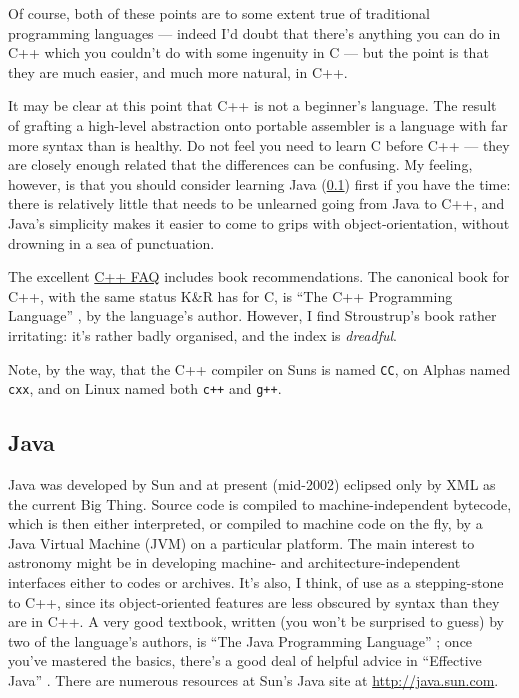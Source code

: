 \documentclass[11pt,oneside,chapters]{starlink}
\begin{document}
Of course, both of these points are to some extent true
of traditional programming languages --- indeed I'd doubt
that there's anything you can do in C++ which you couldn't
do with some ingenuity in C --- but the point is that they
are much easier, and much more natural, in C++.

It may be clear at this point that C++ is not a
beginner's language.  The result of grafting a high-level
abstraction onto portable assembler is a language with far
more syntax than is healthy.  Do not feel you need to
learn C before C++ --- they are closely enough related that
the differences can be confusing.  My feeling, however, is
that you should consider learning Java (\ref{s:java}) first if you have the time: there is
relatively little that needs to be unlearned going from
Java to C++, and Java's simplicity makes it easier to come
to grips with object-orientation, without drowning in a
sea of punctuation.

The excellent
\href{http://www.parashift.com/c++-faq-lite/}{C++ FAQ}
includes book recommendations.  The canonical
book for C++, with the same status K\&R has for C, is
``The C++ Programming Language''
\citep{stroustrup}, by the language's author.
However, I find Stroustrup's book rather irritating: it's
rather badly organised, and the index is
\emph{dreadful}.

Note, by the way, that the C++ compiler on Suns is named
\texttt{CC}, on Alphas named \texttt{cxx}, and on
Linux named both \texttt{c++} and
\texttt{g++}.


\subsection{Java}
\label{s:java}


Java was developed by Sun and at present (mid-2002)
eclipsed only by XML as the current Big Thing.  Source
code is compiled to machine-independent bytecode, which is
then either interpreted, or compiled to machine code on
the fly, by a Java Virtual Machine (JVM) on a particular
platform.  The main interest to astronomy might be in
developing machine- and architecture-independent
interfaces either to codes or archives.  It's also, I
think, of use as a stepping-stone to C++, since its
object-oriented features are less obscured by syntax than
they are in C++.  A very good textbook, written (you won't
be surprised to guess) by two of the language's authors,
is 
``The Java Programming Language'' \citep{arnold98};
once you've mastered the
basics, there's a good deal of helpful advice in
``Effective Java'' \citep{bloch01}.
There are numerous resources at Sun's Java site at
\url{http://java.sun.com}.
\end{document}
